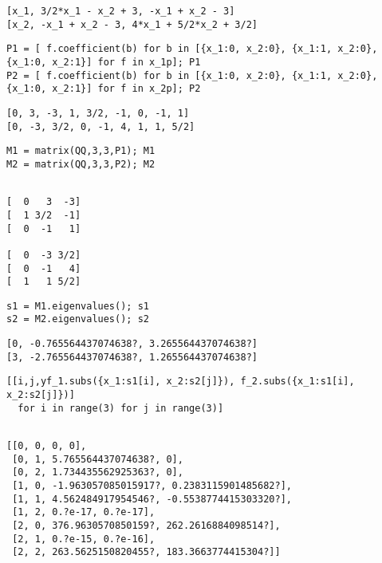 \documentclass[dvipdfmx,11pat]{jarticle}
\begin{document}
\label{orgf57f451}
\begin{verbatim}
[x_1, 3/2*x_1 - x_2 + 3, -x_1 + x_2 - 3]
[x_2, -x_1 + x_2 - 3, 4*x_1 + 5/2*x_2 + 3/2]
\end{verbatim}


\begin{verbatim}
P1 = [ f.coefficient(b) for b in [{x_1:0, x_2:0}, {x_1:1, x_2:0}, {x_1:0, x_2:1}] for f in x_1p]; P1
P2 = [ f.coefficient(b) for b in [{x_1:0, x_2:0}, {x_1:1, x_2:0}, {x_1:0, x_2:1}] for f in x_2p]; P2
\end{verbatim}


\label{orgc433868}
\begin{verbatim}
[0, 3, -3, 1, 3/2, -1, 0, -1, 1]
[0, -3, 3/2, 0, -1, 4, 1, 1, 5/2]
\end{verbatim}


\begin{verbatim}
M1 = matrix(QQ,3,3,P1); M1
M2 = matrix(QQ,3,3,P2); M2

\end{verbatim}

\label{org226c644}
\begin{verbatim}

[  0   3  -3]
[  1 3/2  -1]
[  0  -1   1]

[  0  -3 3/2]
[  0  -1   4]
[  1   1 5/2]
\end{verbatim}


\begin{verbatim}
s1 = M1.eigenvalues(); s1
s2 = M2.eigenvalues(); s2

\end{verbatim}

\label{org2337d17}
\begin{verbatim}
[0, -0.765564437074638?, 3.265564437074638?]
[3, -2.765564437074638?, 1.265564437074638?]
\end{verbatim}


\begin{verbatim}
[[i,j,yf_1.subs({x_1:s1[i], x_2:s2[j]}), f_2.subs({x_1:s1[i], x_2:s2[j]})] 
  for i in range(3) for j in range(3)]
\end{verbatim}

\label{org0e02c49}
\begin{verbatim}

[[0, 0, 0, 0],
 [0, 1, 5.765564437074638?, 0],
 [0, 2, 1.734435562925363?, 0],
 [1, 0, -1.963057085015917?, 0.2383115901485682?],
 [1, 1, 4.562484917954546?, -0.5538774415303320?],
 [1, 2, 0.?e-17, 0.?e-17],
 [2, 0, 376.9630570850159?, 262.2616884098514?],
 [2, 1, 0.?e-15, 0.?e-16],
 [2, 2, 263.5625150820455?, 183.3663774415304?]]
\end{verbatim}
\end{document}
